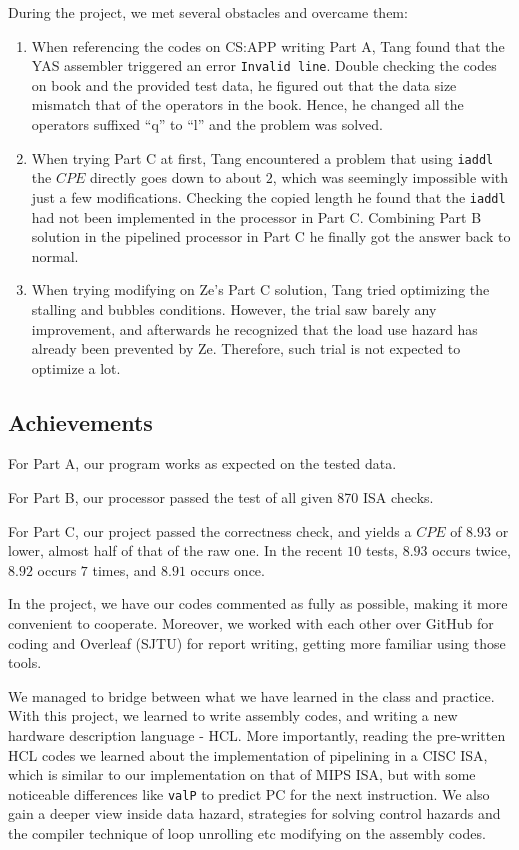 \documentclass{article}
\begin{document}
During the project, we met several obstacles and overcame them:
\begin{enumerate}
    \item When referencing the codes on CS:APP writing Part A, Tang found that the YAS assembler triggered an error \lstinline{Invalid line}. Double checking the codes on book and the provided test data, he figured out that the data size mismatch that of the operators in the book. Hence, he changed all the operators suffixed ``q'' to ``l'' and the problem was solved.
    \item When trying Part C at first, Tang encountered a problem that using \lstinline{iaddl} the $CPE$ directly goes down to about $2$, which was seemingly impossible with just a few modifications. Checking the copied length he found that the \lstinline{iaddl} had not been implemented in the processor in Part C. Combining Part B solution in the pipelined processor in Part C he finally got the answer back to normal.
    \item When trying modifying on Ze's Part C solution, Tang tried optimizing the stalling and bubbles conditions. However, the trial saw barely any improvement, and afterwards he recognized that the load use hazard has already been prevented by Ze. Therefore, such trial is not expected to optimize a lot.
\end{enumerate}

\subsection{Achievements}

\hspace{1 em}

\par For Part A, our program works as expected on the tested data.
\par For Part B, our processor passed the test of all given 870 ISA checks.
\par For Part C, our project passed the correctness check, and yields a $CPE$ of $8.93$ or lower, almost half of that of the raw one. In the recent $10$ tests, $8.93$ occurs twice, $8.92$ occurs $7$ times, and $8.91$ occurs once.
\par In the project, we have our codes commented as fully as possible, making it more convenient to cooperate. Moreover, we worked with each other over GitHub for coding and Overleaf (SJTU) for report writing, getting more familiar using those tools.
\par We managed to bridge between what we have learned in the class and practice. With this project, we learned to write assembly codes, and writing a new hardware description language - HCL. More importantly, reading the pre-written HCL codes we learned about the implementation of pipelining in a CISC ISA, which is similar to our implementation on that of MIPS ISA, but with some noticeable differences like \lstinline{valP} to predict PC for the next instruction. We also gain a deeper view inside data hazard, strategies for solving control hazards and the compiler technique of loop unrolling
etc modifying on the assembly codes.

\end{document}
